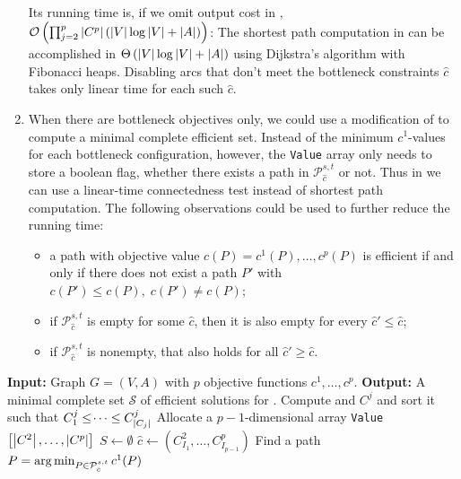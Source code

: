 \documentclass[11pt,english,a4paper,parskip=half-]{scrartcl}
\begin{document}
\begin{solution}
\begin{enumerate}
	Its running time is, if we omit output cost in ,
	$\mathcal{O}\left( \prod_{j=2}^p \left\lvert C^p \right\rvert\left(\left\lvert V \right\rvert \log \left\lvert V \right\rvert + \left\lvert A \right\rvert\right)\right)$: The shortest path computation in 
	 can be accomplished in
	$\Theta\left(\left\lvert V \right\rvert \log \left\lvert V \right\rvert + \left\lvert A \right\rvert\right)$ using Dijkstra's algorithm
	with Fibonacci heaps. Disabling arcs that don't meet the bottleneck constraints
  $\hat c$ takes only linear time for each such $\hat c$. 
  \item When there are bottleneck objectives only, we could use a modification
  of  to compute a minimal complete efficient set.
  Instead of the minimum $c^1$-values for each bottleneck configuration,
  however, the \texttt{Value} array only needs to store a boolean flag,
  whether there exists a path in $\mathcal P^{s,t}_{\hat c}$ or not. Thus
  in  we can use a linear-time connectedness test
  instead of shortest path computation. 
  The following observations could be used to further reduce the running
  time:
  \begin{itemize}
    \item a path with objective
  value $c(P) = c^1(P),\dotsc,c^p(P)$ is efficient if and only if there does not
  exist a path $P'$ with $c(P') \leq c(P),\; c(P') \neq c(P)$;
    \item if $\mathcal P^{s,t}_{\hat c}$ is empty for some $\hat c$, then it is also empty
  for every $\hat c' \leq \hat c$;
    \item  if $\mathcal P^{s,t}_{\hat c}$ is nonempty, that also holds for all $\hat c' \geq \hat c$.
  \end{itemize}
  \end{enumerate}
\begin{algorithm}[H]
	\begin{algorithmic}[1]
	\State\textbf{Input:} Graph $G=(V,A)$ with $p$ objective functions $c^1,\dotsc,c^p$.
	\State\textbf{Output:} A minimal complete set $\mathcal S$ of efficient solutions for .
		\State Compute and $C^j$ and sort it such that $C^j_1 \leq \dotsi \leq C^j_{\left\lvert  C_j \right\rvert}$
	\EndFor
	\State Allocate a $p-1$-dimensional array
		\texttt{Value}$\left[\left\lvert C^2 \right\rvert,\dotsc,\left\lvert C^p \right\rvert\right]$
	\State $S \gets \emptyset$
	\label{line:forloop}
		\State $\hat c \gets (C^2_{I_1}, \dotsc, C^p_{I_{p-1}})$
		 \label{line:genpath}
		\State Find a path $P = \operatorname*{arg\,min}_{P \in \mathcal P^{s,t}_{\hat c}} c^1(P)$

\end{algorithmic}
\end{algorithm}
\end{solution}
\end{document}
